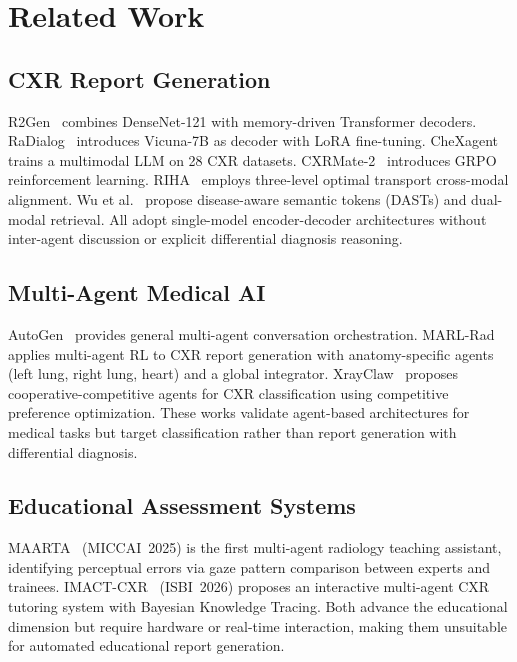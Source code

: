 \documentclass[runningheads,10pt]{llncs}
\begin{document}
\section{Related Work}

\subsection{CXR Report Generation}
R2Gen~\cite{r2gen} combines DenseNet-121 with memory-driven Transformer decoders. RaDialog~\cite{radialog} introduces Vicuna-7B as decoder with LoRA fine-tuning. CheXagent~\cite{chexagent} trains a multimodal LLM on 28 CXR datasets. CXRMate-2~\cite{cxrmate2} introduces GRPO reinforcement learning. RIHA~\cite{riha} employs three-level optimal transport cross-modal alignment. Wu et al.~\cite{diseaseaware} propose disease-aware semantic tokens (DASTs) and dual-modal retrieval. All adopt single-model encoder-decoder architectures without inter-agent discussion or explicit differential diagnosis reasoning.

\subsection{Multi-Agent Medical AI}
AutoGen~\cite{autogen} provides general multi-agent conversation orchestration. MARL-Rad~\cite{marlrad} applies multi-agent RL to CXR report generation with anatomy-specific agents (left lung, right lung, heart) and a global integrator. XrayClaw~\cite{xrayclaw} proposes cooperative-competitive agents for CXR classification using competitive preference optimization. These works validate agent-based architectures for medical tasks but target classification rather than report generation with differential diagnosis.

\subsection{Educational Assessment Systems}
MAARTA~\cite{maarta} (MICCAI~2025) is the first multi-agent radiology teaching assistant, identifying perceptual errors via gaze pattern comparison between experts and trainees. IMACT-CXR~\cite{imactcxr} (ISBI~2026) proposes an interactive multi-agent CXR tutoring system with Bayesian Knowledge Tracing. Both advance the educational dimension but require hardware or real-time interaction, making them unsuitable for automated educational report generation.
\end{document}
